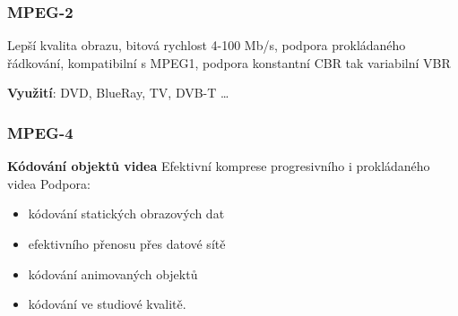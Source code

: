 \subsubsection{MPEG-2}
Lepší kvalita obrazu, bitová rychlost 4-100 Mb/s, podpora prokládaného řádkování, kompatibilní
s MPEG1, podpora konstantní CBR tak variabilní VBR

\textbf{Využití}: DVD, BlueRay, TV, DVB-T …

\subsubsection{MPEG-4}
\textbf{Kódování objektů videa}
Efektivní komprese progresivního i prokládaného videa
Podpora:
\begin{itemize}
    \item kódování statických obrazových dat
    \item efektivního přenosu přes datové sítě 
    \item kódování animovaných objektů 
    \item kódování ve studiové kvalitě.
\end{itemize}